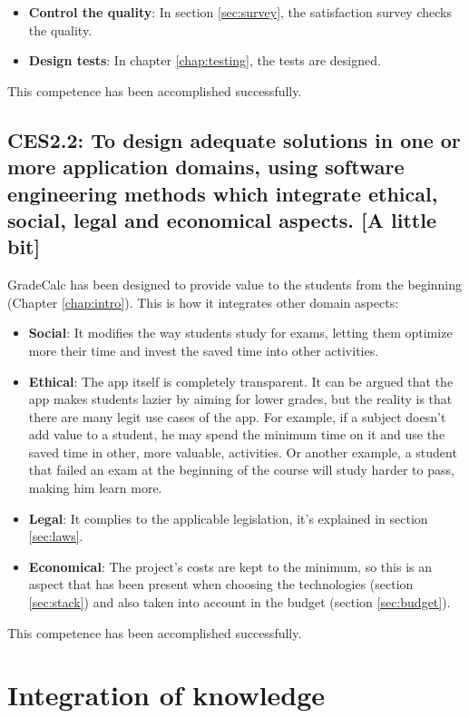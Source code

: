\begin{itemize}[noitemsep]
    \item \textbf{Control the quality}: In section \ref{sec:survey}, the satisfaction survey checks the quality.
    \item \textbf{Design tests}: In chapter \ref{chap:testing}, the tests are designed.
\end{itemize}

\noindent
This competence has been accomplished successfully.


\subsection*{CES2.2: To design adequate solutions in one or more application domains, using software engineering methods which integrate ethical, social, legal and economical aspects. {\normalfont\normalsize [A little bit]}}

GradeCalc has been designed to provide value to the students from the beginning (Chapter \ref{chap:intro}). This is how it integrates other domain aspects:
\begin{itemize}
    \item \textbf{Social}: It modifies the way students study for exams, letting them optimize more their time and invest the saved time into other activities. 
    \item \textbf{Ethical}: The app itself is completely transparent. It can be argued that the app makes students lazier by aiming for lower grades, but the reality is that there are many legit use cases of the app. For example, if a subject doesn't add value to a student, he may spend the minimum time on it and use the saved time in other, more valuable, activities. Or another example, a student that failed an exam at the beginning of the course will study harder to pass, making him learn more.
    \item \textbf{Legal}: It complies to the applicable legislation, it's explained in section \ref{sec:laws}.
    \item \textbf{Economical}: The project's costs are kept to the minimum, so this is an aspect that has been present when choosing the technologies (section \ref{sec:stack}) and also taken into account in the budget (section \ref{sec:budget}).
\end{itemize}

\noindent
This competence has been accomplished successfully.


\clearpage\newpage
\section{Integration of knowledge}

